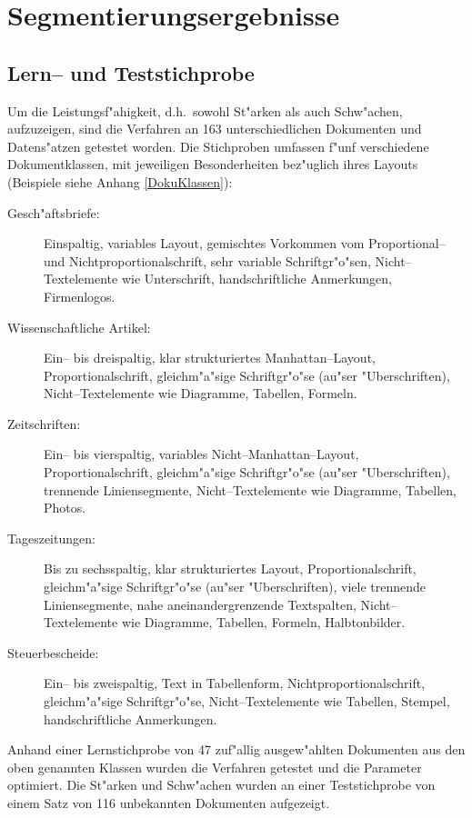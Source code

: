 \section{Segmentierungsergebnisse}\label{ErgebnisZoning}

\subsection{Lern-- und Teststichprobe}
Um die Leistungsf"ahigkeit, d.h.\ sowohl St"arken als auch Schw"achen,
aufzuzeigen, sind die Verfahren an 163 unterschiedlichen Dokumenten und Datens"atzen getestet worden.
Die Stichproben umfassen f"unf verschiedene Dokumentklassen, mit jeweiligen Besonderheiten
bez"uglich ihres Layouts (Beispiele siehe Anhang \ref{DokuKlassen}):

\begin{description}
  \item[Gesch"aftsbriefe:]Einspaltig, variables Layout, gemischtes Vorkommen vom
  Pro\-por\-tio\-nal-- und Nichtproportionalschrift,
  sehr variable Schriftgr"o"sen, Nicht--Textelemente wie Unterschrift, handschriftliche Anmerkungen,
  Firmenlogos.
  \item[Wissenschaftliche Artikel:]Ein-- bis dreispaltig, klar strukturiertes Manhattan--Layout,
  Proportionalschrift, gleichm"a"sige Schriftgr"o"se (au"ser "Uberschriften),
  Nicht--Text\-ele\-mente wie Diagramme, Tabellen, Formeln.
  \item[Zeitschriften:]Ein-- bis vierspaltig, variables Nicht--Manhattan--Layout,
  Proportionalschrift, gleichm"a"sige Schriftgr"o"se (au"ser "Uberschriften), trennende Liniensegmente,
  Nicht--Textelemente wie Diagramme, Tabellen, Photos.
  \item[Tageszeitungen:]Bis zu sechsspaltig, klar strukturiertes Layout, Proportionalschrift,
  gleichm"a"sige Schriftgr"o"se (au"ser "Uberschriften), viele trennende Liniensegmente, nahe 
  aneinandergrenzende Textspalten,
  Nicht--Textelemente wie Diagramme, Tabellen, Formeln, Halbtonbilder.
  \item[Steuerbescheide:]Ein-- bis zweispaltig, Text in Tabellenform, Nichtproportionalschrift,
  gleichm"a"sige Schriftgr"o"se, Nicht--Textelemente wie Tabellen, Stempel, handschriftliche
  Anmerkungen.
\end{description}

Anhand einer Lernstichprobe von 47 zuf"allig ausgew"ahlten Dokumenten aus den oben 
genannten Klassen wurden die Verfahren getestet und
die Parameter optimiert. Die St"arken und Schw"achen wurden an einer Teststichprobe von einem Satz
von 116 unbekannten Dokumenten aufgezeigt.

